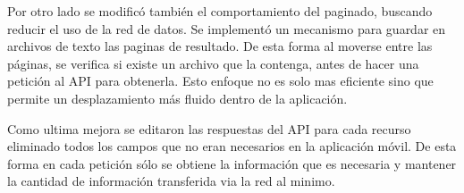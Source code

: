 Por otro lado se modificó también el comportamiento del paginado, buscando reducir el uso de la red de datos. Se implementó un mecanismo para guardar en archivos de texto las paginas de resultado. De esta forma al moverse entre las páginas, se verifica si existe un archivo que la contenga, antes de hacer una petición al API para obtenerla. Esto enfoque no es solo mas eficiente sino que permite un desplazamiento más fluido dentro de la aplicación.

Como ultima mejora se editaron las respuestas del API para cada recurso eliminado todos los campos que no eran necesarios en la aplicación móvil. De esta forma en cada petición sólo se obtiene la información que es necesaria y mantener la cantidad de información transferida via la red al minimo.




